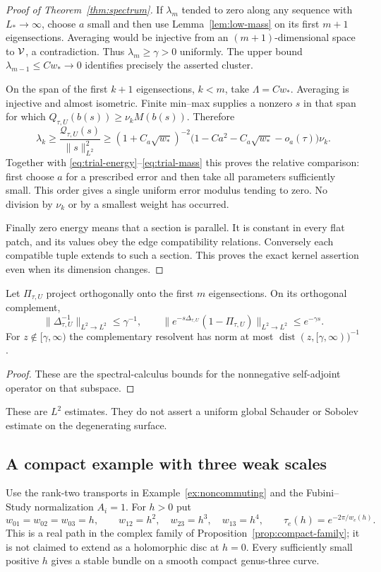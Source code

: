 \begin{proof}[Proof of Theorem~\ref{thm:spectrum}]
If $\lambda_m$ tended to zero along any sequence with
$L_*\to\infty$, choose $a$ small and then use
Lemma~\ref{lem:low-mass} on its first $m+1$
eigensections. Averaging would be injective from an
$(m+1)$-dimensional space to $\mathcal V$, a contradiction.
Thus $\lambda_m\ge\gamma>0$ uniformly. The upper
bound $\lambda_{m-1}\le Cw_*\to0$ identifies precisely
the asserted cluster.

On the span of the first $k+1$ eigensections, $k<m$,
take $\Lambda=Cw_*$. Averaging is injective and
almost isometric. Finite min--max supplies a nonzero
$s$ in that span for which
$Q_{\tau,U}(b(s))\ge\nu_kM(b(s))$. Therefore
\[
 \lambda_k\ge
 \frac{\mathcal Q_{\tau,U}(s)}{\|s\|_{L^2}^2}
 \ge(1+C_a\sqrt{w_*})^{-2}
       \big(1-Ca^2-C_a\sqrt{w_*}-o_a(\tau)\big)\nu_k.
\]
Together with \eqref{eq:trial-energy}--\eqref{eq:trial-mass}
this proves the relative comparison: first choose $a$
for a prescribed error and then take all parameters
sufficiently small. This order gives a single uniform
error modulus tending to zero. No division by $\nu_k$
or by a smallest weight has occurred.

Finally zero energy means that a section is parallel.
It is constant in every flat patch, and its values
obey the edge compatibility relations. Conversely each
compatible tuple extends to such a section. This
proves the exact kernel assertion even when its
dimension changes.
\end{proof}

\begin{corollary}\label{cor:complement}
Let $\Pi_{\tau,U}$ project orthogonally onto the first
$m$ eigensections. On its orthogonal complement,
\[
 \|\Delta_{\tau,U}^{-1}\|_{L^2\to L^2}\le\gamma^{-1},
 \qquad
 \|e^{-s\Delta_{\tau,U}}(1-\Pi_{\tau,U})\|_{L^2\to L^2}
 \le e^{-\gamma s}.
\]
For $z\notin[\gamma,\infty)$ the complementary resolvent
has norm at most $\operatorname{dist}(z,[\gamma,\infty))^{-1}$.
\end{corollary}
\begin{proof}
These are the spectral-calculus bounds for the
nonnegative self-adjoint operator on that subspace.
\end{proof}

These are $L^2$ estimates. They do not assert a uniform
global Schauder or Sobolev estimate on the degenerating
surface.

\subsection{A compact example with three weak scales}
Use the rank-two transports in Example~\ref{ex:noncommuting}
and the Fubini--Study normalization $A_i=1$. For $h>0$ put
\[
 w_{01}=w_{02}=w_{03}=h,\qquad
 w_{12}=h^2,\quad w_{23}=h^3,\quad w_{13}=h^4,
 \qquad \tau_e(h)=e^{-2\pi/w_e(h)}.
\]
This is a real path in the complex family of
Proposition~\ref{prop:compact-family}; it is not claimed
to extend as a holomorphic disc at $h=0$.
Every sufficiently small positive $h$ gives a stable bundle on a smooth
compact genus-three curve.

